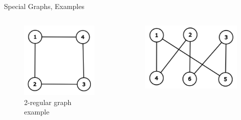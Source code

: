 \documentclass[aspectratio=169]{beamer}%
\begin{document}
\begin{frame}{Special Graphs, Examples}%
    \begin{columns}[T]%
        \begin{column}{.32\textwidth}%
            \begin{figure}%
                \centering%
                \includegraphics[width=.9\linewidth]{graph6.png}%
                \caption{2-regular graph example}%
            \end{figure}%
        \end{column}%
        \hfill
        \begin{column}{.32\textwidth}%
            \begin{figure}%
                \centering%
                \includegraphics[width=.9\linewidth]{graph7.png}%

\end{figure}
\end{column}
\end{columns}
\end{frame}
\end{document}
